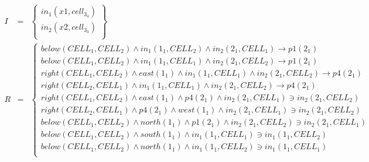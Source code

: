 \begin{eqnarray*}
I & = & \left\{ \begin{array}{l}
\mathit{in}_1(\mathit{x}1,\mathit{cell}_3_4)\\
\mathit{in}_2(\mathit{x}2,\mathit{cell}_3_3)\\
\end{array}\right\}\\
R & = &  \left\{ \begin{array}{l}
\mathit{below}(\mathit{CELL}_1,\mathit{CELL}_2) \wedge \mathit{in}_1(\mathit{}1_1,\mathit{CELL}_2) \wedge \mathit{in}_2(\mathit{}2_1,\mathit{CELL}_1) \rightarrow \mathit{p}1(\mathit{}2_1)\\
\mathit{below}(\mathit{CELL}_1,\mathit{CELL}_2) \wedge \mathit{in}_1(\mathit{}1_1,\mathit{CELL}_1) \wedge \mathit{in}_2(\mathit{}2_1,\mathit{CELL}_2) \rightarrow \mathit{p}1(\mathit{}2_1)\\
\mathit{right}(\mathit{CELL}_1,\mathit{CELL}_2) \wedge \mathit{east}(\mathit{}1_1) \wedge \mathit{in}_1(\mathit{}1_1,\mathit{CELL}_1) \wedge \mathit{in}_2(\mathit{}2_1,\mathit{CELL}_2) \rightarrow \mathit{p}4(\mathit{}2_1)\\
\mathit{right}(\mathit{CELL}_2,\mathit{CELL}_1) \wedge \mathit{in}_1(\mathit{}1_1,\mathit{CELL}_1) \wedge \mathit{in}_2(\mathit{}2_1,\mathit{CELL}_2) \rightarrow \mathit{p}4(\mathit{}2_1)\\
\mathit{right}(\mathit{CELL}_1,\mathit{CELL}_2) \wedge \mathit{east}(\mathit{}1_1) \wedge \mathit{p}4(\mathit{}2_1) \wedge \mathit{in}_2(\mathit{}2_1,\mathit{CELL}_1) \ni \mathit{in}_2(\mathit{}2_1,\mathit{CELL}_2)\\
\mathit{right}(\mathit{CELL}_2,\mathit{CELL}_1) \wedge \mathit{p}4(\mathit{}2_1) \wedge \mathit{west}(\mathit{}1_1) \wedge \mathit{in}_2(\mathit{}2_1,\mathit{CELL}_1) \ni \mathit{in}_2(\mathit{}2_1,\mathit{CELL}_2)\\
\mathit{below}(\mathit{CELL}_1,\mathit{CELL}_2) \wedge \mathit{north}(\mathit{}1_1) \wedge \mathit{p}1(\mathit{}2_1) \wedge \mathit{in}_2(\mathit{}2_1,\mathit{CELL}_2) \ni \mathit{in}_2(\mathit{}2_1,\mathit{CELL}_1)\\
\mathit{below}(\mathit{CELL}_1,\mathit{CELL}_2) \wedge \mathit{south}(\mathit{}1_1) \wedge \mathit{in}_1(\mathit{}1_1,\mathit{CELL}_1) \ni \mathit{in}_1(\mathit{}1_1,\mathit{CELL}_2)\\
\mathit{below}(\mathit{CELL}_1,\mathit{CELL}_2) \wedge \mathit{north}(\mathit{}1_1) \wedge \mathit{in}_1(\mathit{}1_1,\mathit{CELL}_2) \ni \mathit{in}_1(\mathit{}1_1,\mathit{CELL}_1)\\

\end{array}
\end{eqnarray*}
